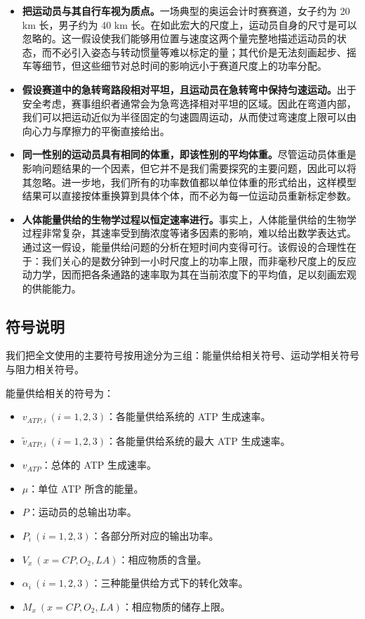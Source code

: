 \documentclass[11pt,a4paper]{ctexart}
\begin{document}
\begin{itemize}
\item \textbf{把运动员与其自行车视为质点。}一场典型的奥运会计时赛赛道，女子约为 20 km 长，男子约为 40 km 长。在如此宏大的尺度上，运动员自身的尺寸是可以忽略的。这一假设使我们能够用位置与速度这两个量完整地描述运动员的状态，而不必引入姿态与转动惯量等难以标定的量；其代价是无法刻画起步、摇车等细节，但这些细节对总时间的影响远小于赛道尺度上的功率分配。
\item \textbf{假设赛道中的急转弯路段相对平坦，且运动员在急转弯中保持匀速运动。}出于安全考虑，赛事组织者通常会为急弯选择相对平坦的区域。因此在弯道内部，我们可以把运动近似为半径固定的匀速圆周运动，从而使过弯速度上限可以由向心力与摩擦力的平衡直接给出。
\item \textbf{同一性别的运动员具有相同的体重，即该性别的平均体重。}尽管运动员体重是影响问题结果的一个因素，但它并不是我们需要探究的主要问题，因此可以将其忽略。进一步地，我们所有的功率数值都以单位体重的形式给出，这样模型结果可以直接按体重换算到具体个体，而不必为每一位运动员重新标定参数。
\item \textbf{人体能量供给的生物学过程以恒定速率进行。}事实上，人体能量供给的生物学过程非常复杂，其速率受到酶浓度等诸多因素的影响，难以给出数学表达式。通过这一假设，能量供给问题的分析在短时间内变得可行。该假设的合理性在于：我们关心的是数分钟到一小时尺度上的功率上限，而非毫秒尺度上的反应动力学，因而把各条通路的速率取为其在当前浓度下的平均值，足以刻画宏观的供能能力。
\end{itemize}

\subsection{符号说明}

我们把全文使用的主要符号按用途分为三组：能量供给相关符号、运动学相关符号与阻力相关符号。

能量供给相关的符号为：
\begin{itemize}
\item $v_{ATP,i}\ (i=1,2,3)$：各能量供给系统的 ATP 生成速率。
\item $\tilde{v}_{ATP,i}\ (i=1,2,3)$：各能量供给系统的最大 ATP 生成速率。
\item $v_{ATP}$：总体的 ATP 生成速率。
\item $\mu$：单位 ATP 所含的能量。
\item $P$：运动员的总输出功率。
\item $P_i\ (i=1,2,3)$：各部分所对应的输出功率。
\item $V_x\ (x=CP,O_2,LA)$：相应物质的含量。
\item $\alpha_i\ (i=1,2,3)$：三种能量供给方式下的转化效率。
\item $M_x\ (x=CP,O_2,LA)$：相应物质的储存上限。
\end{itemize}
\end{document}
